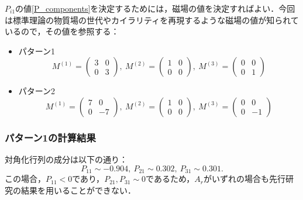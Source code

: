 \documentclass[a4paper,uplatex,dvipdfmx,10pt]{jsarticle}
\theoremstyle{definition}
\begin{document}
$P_{i1}$の値\eqref{P_components}を決定するためには，磁場の値を決定すればよい．今回は標準理論の物質場の世代やカイラリティを再現するような磁場の値が知られているので，その値を参照する：
\begin{itemize}
   \item 
   パターン1\cite{Abe_SuperfieldDescription_2012}
   \begin{equation}
      M^{(1)}
      =
      \begin{pmatrix}
        3 & 0 \\
        0 & 3
      \end{pmatrix}
      ,\ 
      M^{(2)}
      =
      \begin{pmatrix}
        1 & 0 \\
        0 & 0
      \end{pmatrix}
      ,\ 
      M^{(3)}
      =
      \begin{pmatrix}
        0 & 0 \\
        0 & 1
      \end{pmatrix}
      \nonumber
   \end{equation}
   \item 
   パターン2\cite{Abe_AhlerModuli_2017}
   \begin{equation}
      M^{(1)}
      =
      \begin{pmatrix}
        7 & 0 \\
        0 & -7
      \end{pmatrix}
      ,\ 
      M^{(2)}
      =
      \begin{pmatrix}
        1 & 0 \\
        0 & 0
      \end{pmatrix}
      ,\ 
      M^{(3)}
      =
      \begin{pmatrix}
        0 & 0 \\
        0 & -1
      \end{pmatrix}
      \nonumber
   \end{equation}
\end{itemize}

\subsubsection*{パターン1の計算結果}

対角化行列の成分は以下の通り：
\begin{equation}
   P_{11}\sim -0.904
   ,\ 
   P_{21}\sim 0.302
   ,\ 
   P_{31}\sim 0.301
   .
   \nonumber
\end{equation}
この場合，$P_{11}<0$であり，$P_{21},P_{31}\sim 0$であるため，$A_{r}$がいずれの場合も先行研究の結果を用いることができない．
\end{document}
